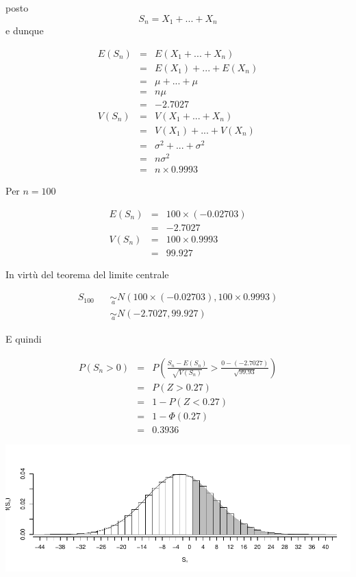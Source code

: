 \documentclass[
  11pt,
]{book}
\theoremstyle{mytheoremstyle}
\theoremstyle{mydefstyle}
\begin{document}
posto
\[
S_n = X_1+...+X_n
\]
e dunque

\begin{eqnarray*}
E(S_n) &=& E(X_1+...+X_n)\\
       &=& E(X_1)+...+E(X_n)\\
       &=& \mu+...+\mu\\
       &=& n\mu\\
       &=& -2.7027\\
V(S_n) &=& V(X_1+...+X_n)\\
       &=& V(X_1)+...+V(X_n)\\
       &=&\sigma^2+...+\sigma^2\\
       &=& n\sigma^2\\
       &=& n\times 0.9993
\end{eqnarray*}

Per \(n=100\)

\begin{eqnarray*}
E(S_n) &=& 100\times (-0.02703)\\
       &=& -2.7027\\
V(S_n) &=& 100\times 0.9993\\
       &=& 99.927
\end{eqnarray*}

In virtù del teorema del limite centrale

\begin{eqnarray*}
S_{100}&&\operatorname*{\sim}_{a} N(100\times(-0.02703),100\times0.9993)\\
&& \operatorname*{\sim}_{a}  N(-2.7027,99.927)
\end{eqnarray*}

E quindi

\begin{eqnarray*}
      P( S_n   >   0 ) 
        &=& P\left(  \frac { S_n  -  E(S_n) }{ \sqrt{V(S_n)} }  >  \frac { 0  -  ( -2.7027 ) }{\sqrt{ 99.93 }} \right)  \\
                 &=& P\left(  Z   >   0.27 \right) \\    &=& 1-P(Z< 0.27 )\\ 
                 &=&  1-\Phi( 0.27 ) \\ &=&  0.3936 
      \end{eqnarray*}

\begin{center}\includegraphics{Appunti_di_Statistica_2025_files/figure-latex/08-tlc-15-1} \end{center}
\end{document}
